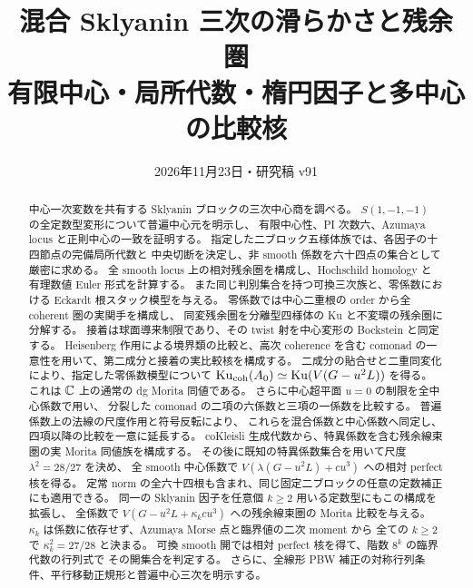

\title{混合 Sklyanin 三次の滑らかさと残余圏\\
\large 有限中心・局所代数・楕円因子と多中心の比較核}
\author{}
\date{2026年11月23日・研究稿 v91}


\maketitle
\begin{abstract}
中心一次変数を共有する Sklyanin ブロックの三次中心商を調べる。
$S(1,-1,-1)$ の全定数型変形について普遍中心元を明示し、
有限中心性、PI 次数六、Azumaya locus と正則中心の一致を証明する。
指定した二ブロック五様体族では、各因子の十四節点の完備局所代数と
中央切断を決定し、非 smooth 係数を六十四点の集合として厳密に求める。
全 smooth locus 上の相対残余圏を構成し、Hochschild homology と
有理数値 Euler 形式を計算する。
また同じ判別集合を持つ可換三次族と、零係数における Eckardt 根スタック模型を与える。
零係数では中心二重根の order から全 coherent 圏の実関手を構成し、
同変残余圏を分離型四様体の Ku と不変環の残余圏に分解する。
接着は球面導来制限であり、その twist 射を中心変形の Bockstein と同定する。
Heisenberg 作用による境界類の比較と、高次 coherence を含む
comonad の一意性を用いて、第二成分と接着の実比較核を構成する。
二成分の貼合せと二重同変化により、指定した零係数模型について
$\operatorname{Ku}_{\mathrm{coh}}(A_0)\simeq\operatorname{Ku}(V(G-u^2L))$ を得る。
これは $\mathbb C$ 上の通常の dg Morita 同値である。
さらに中心超平面 $u=0$ の制限を全中心係数で用い、
分裂した comonad の二項の六係数と三項の一係数を比較する。
普遍係数上の法線の尺度作用と符号反転により、
これらを混合係数と中心係数へ同定し、四項以降の比較を一意に延長する。
coKleisli 生成代数から、特異係数を含む残余線束圏の実 Morita 同値族を構成する。
その後に既知の特異係数集合を用いて尺度 $\lambda^2=28/27$ を決め、
全 smooth 中心係数で $V(\lambda(G-u^2L)+cu^3)$ への相対 perfect 核を得る。
定常 norm の全六十四根も含まれ、同じ固定二ブロックの任意の定数補正にも適用できる。
同一の Sklyanin 因子を任意個 $k\ge2$ 用いる定数型にもこの構成を拡張し、
全係数で $V(G-u^2L+\kappa_kcu^3)$ への残余線束圏の Morita 比較を与える。
$\kappa_k$ は係数に依存せず、Azumaya Morse 点と臨界値の二次 moment から
全ての $k\ge2$ で $\kappa_k^2=27/28$ と決まる。
可換 smooth 開では相対 perfect 核を得て、階数 $8^k$ の臨界代数の行列式で
その開集合を判定する。
さらに、全線形 PBW 補正の対称行列条件、平行移動正規形と普遍中心三次を明示する。

\end{abstract}
